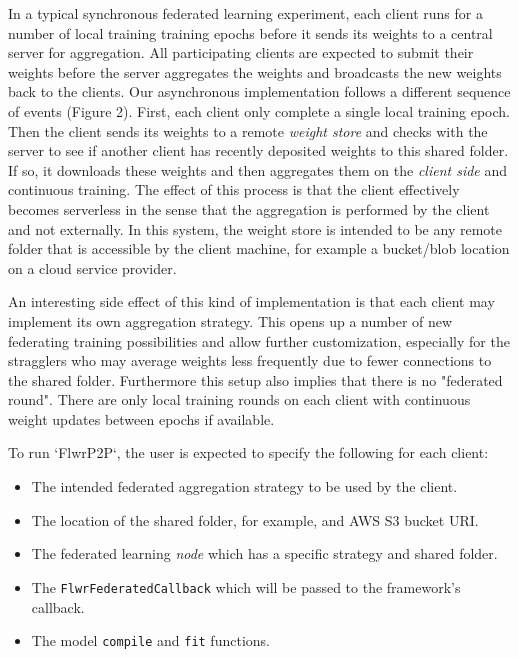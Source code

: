 \documentclass[twocolumn, switch]{article} %
\begin{document}
In a typical synchronous federated learning experiment, each client runs for a number of local training training epochs before it sends its weights to a central server for aggregation. All participating clients are expected to submit their weights before the server aggregates the weights and broadcasts the new weights back to the clients. Our asynchronous implementation follows a different sequence of events (Figure 2). First, each client only complete a single local training epoch. Then the client sends its weights to a remote \textit{weight store} and checks with the server to see if another client has recently deposited weights to this shared folder. If so, it downloads these weights and then aggregates them on the \textit{client side} and continuous training. The effect of this process is that the client effectively becomes serverless in the sense that the aggregation is performed by the client and not externally. In this system, the weight store is intended to be any remote folder that is accessible by the client machine, for example a bucket/blob location on a cloud service provider.

An interesting side effect of this kind of implementation is that each client may implement its own aggregation strategy. This opens up a number of new federating training possibilities and allow further customization, especially for the stragglers who may average weights less frequently due to fewer connections to the shared folder. Furthermore this setup also implies that there is no "federated round". There are only local training rounds on each client with continuous weight updates between epochs if available. 

To run `FlwrP2P`, the user is expected to specify the following for each client:

\begin{itemize}
    \item The intended federated aggregation strategy to be used by the client.
    \item The location of the shared folder, for example, and AWS S3 bucket URI.
    \item The federated learning \textit{node} which has a specific strategy and shared folder.
    \item The \texttt{FlwrFederatedCallback} which will be passed to the framework's callback.
    \item The model \texttt{compile} and \texttt{fit} functions.
\end{itemize}
\end{document}
